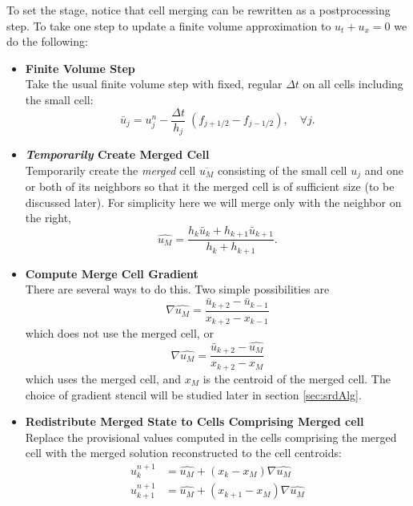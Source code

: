 To set the stage, notice that cell merging can
be rewritten as a postprocessing step.
To take one step to update a finite volume approximation to
$u_t + u_x = 0$ we do the following:
\begin{itemize}
\setlength\itemsep{.2in}
\item
{\bf Finite Volume Step}\\
Take the usual finite volume step with fixed, regular  $\Delta t$ on all cells 
including the small cell:
\begin{equation}
\bar{u}_j = u_j^n - \frac{\Delta t}{h_j} \; (f_{j+1/2} - f_{j-1/2} ), 
\quad \forall j.
\label{eqn:fvupdate}
\end{equation}

\item
{\bf {\em Temporarily} Create Merged Cell}\\
Temporarily create the {\em merged} cell $\overline{u_M}$ consisting of the small cell $u_j$ and one
or both of its neighbors so that it the merged cell is of sufficient
size (to be discussed later).  For simplicity here we will merge 
only with the neighbor on the right,
\begin{equation}
\widehat{u_M} =  \frac{ h_k \bar{u}_k + h_{k+1} \bar{u}_{k+1} } {h_k +
h_{k+1}} .
\label{eqn:mergestep}
\end{equation}

\item
{\bf Compute Merge Cell Gradient }\\
There are several ways to do this. 
Two simple possibilities are 
\begin{equation}
\nabla \widehat{u_M} = \frac{\bar{u}_{k+2} - \bar{u}_{k-1}} {x_{k+2}-x_{k-1}}
\label{eqn:gradLim1}
\end{equation}
which does not use the merged cell,
or
\begin{equation}
\nabla \widehat{u_M} = \frac{\bar{u}_{k+2} - \widehat{u_{M}}} {x_{k+2}-x_{M}}
\label{eqn:gradLim2}
\end{equation}
which uses the merged cell, and $x_M$ is the centroid of the merged
cell.
The choice of gradient stencil will be studied later in section \ref{sec:srdAlg}.


\item
{\bf Redistribute Merged State to Cells Comprising Merged cell }\\
Replace the provisional values computed in the cells comprising the
merged cell with the merged solution reconstructed to the cell
centroids:
\begin{equation}
\begin{split}
u_k^{n+1} &= \widehat{u_M} +  (x_k - x_M) \nabla \widehat{u_M}\\
u_{k+1}^{n+1} &= \widehat{u_M} +  (x_{k+1} - x_M) \nabla \widehat{u_M}
\end{split}
\end{equation}
\end{itemize}

